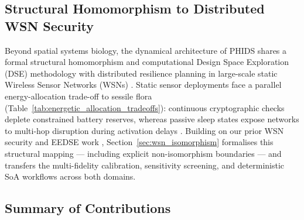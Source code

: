 \subsection{Structural Homomorphism to Distributed WSN Security}
\label{sec:intro_wsn_paradigm}

Beyond spatial systems biology, the dynamical architecture of PHIDS shares a formal structural homomorphism and computational Design Space Exploration (DSE) methodology with distributed resilience planning in large-scale static Wireless Sensor Networks (WSNs) \cite{forster2023novel, forster2024determining, forster2024topology, dressler2010survey}. Static sensor deployments face a parallel energy-allocation trade-off to sessile flora (Table~\ref{tab:energetic_allocation_tradeoffs}): continuous cryptographic checks deplete constrained battery reserves, whereas passive sleep states expose networks to multi-hop disruption during activation delays \cite{forster2023novel, forster2024determining}. Building on our prior WSN security and EEDSE work \cite{forster2023novel, forster2024determining, forster2024topology, dietrich2025visual}, Section~\ref{sec:wsn_isomorphism} formalises this structural mapping --- including explicit non-isomorphism boundaries --- and transfers the multi-fidelity calibration, sensitivity screening, and deterministic SoA workflows across both domains.

\begin{table}[b]
  \centering
  \caption{Energetic Allocation Trade-offs Across Autotrophic Phenotypic Strategies in Meso-Scale Biotopes.}
  \label{tab:energetic_allocation_tradeoffs}
  
\end{table}

\subsection{Summary of Contributions}
\label{sec:intro_contributions}

